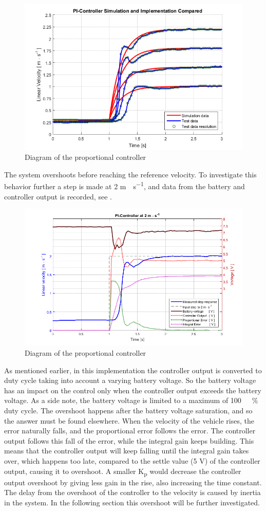 %
\begin{figure}[H]
 	\centering
 	\includegraphics[width=.8\textwidth]{figures/multiStepPI}
 	\caption{Diagram of the proportional controller}
 	\label{fig:multiStepPI}
\end{figure}
%
The system overshoots before reaching the reference velocity. To investigate this behavior further a step is made at 2 \si{m\cdot s^{-1}}, and data from the battery and controller output is recorded, see .
%
\begin{figure}[H]
 	\centering
 	\includegraphics[width=.8\textwidth]{figures/PInoAntiWindup}
 	\caption{Diagram of the proportional controller}
 	\label{fig:PInoAntiWindup}
\end{figure}
%
As mentioned earlier, in this implementation the controller output is converted to duty cycle taking into account a varying battery voltage. So the battery voltage has an impact on the control only when the controller output exceeds the battery voltage. As a side note, the battery voltage is limited to a maximum of \si{100 \ \%} duty cycle.
The overshoot happens after the battery voltage saturation, and so the answer must be found elsewhere.
When the velocity of the vehicle rises, the error naturally falls, and the proportional error follows the error. The controller output follows this fall of the error, while the integral gain keeps building. This means that the controller output will keep falling until the integral gain takes over, which happens too late, compared to the settle value (5 V) of the controller output, causing it to overshoot. A smaller \si{K_p} would decrease the controller output overshoot by giving less gain in the rise, also increasing the time constant.
The delay from the overshoot of the controller to the velocity is caused by inertia in the system.
In the following section this overshoot will be further investigated.
%
